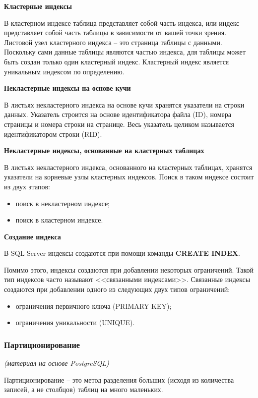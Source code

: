 \textbf{Кластерные индексы}

В кластерном индексе таблица представляет собой часть индекса, или индекс представляет собой часть таблицы в зависимости от вашей точки зрения. Листовой узел кластерного индекса – это страница таблицы с данными. Поскольку сами данные таблицы являются частью индекса, для таблицы может быть создан только один кластерный индекс. Кластерный индекс является уникальным индексом по определению.

\textbf{Некластерные индексы на основе кучи}

В листьях некластерного индекса на основе кучи хранятся указатели на строки данных. Указатель строится на основе идентификатора файла (ID), номера страницы и номера строки на странице. Весь указатель целиком называется идентификатором строки (RID).

\textbf{Некластерные индексы, основанные на кластерных таблицах}

В листьях некластерного индекса, основанного на кластерных таблицах, хранятся указатели на корневые узлы кластерных индексов. Поиск в таком индексе состоит из двух этапов:

\begin{itemize}
	\item поиск в некластерном индексе;
	\item поиск в кластерном индексе.
\end{itemize}

\textbf{Создание индекса}

В SQL Server индексы создаются при помощи команды \textbf{CREATE INDEX}.

Помимо этого, индексы создаются при добавлении некоторых ограничений. Такой тип индексов часто называют <<связанными индексами>>. Связанные индексы создаются при добавлении одного из следующих двух типов ограничений: 
\begin{itemize}
	\item ограничения первичного ключа (PRIMARY KEY); 
	\item ограничения уникальности (UNIQUE). 
\end{itemize}

\subsubsection{Партиционирование}
\textit{(материал на основе PostgreSQL)}

Партиционирование – это метод разделения больших (исходя из количества записей, а не столбцов) таблиц на много маленьких.

